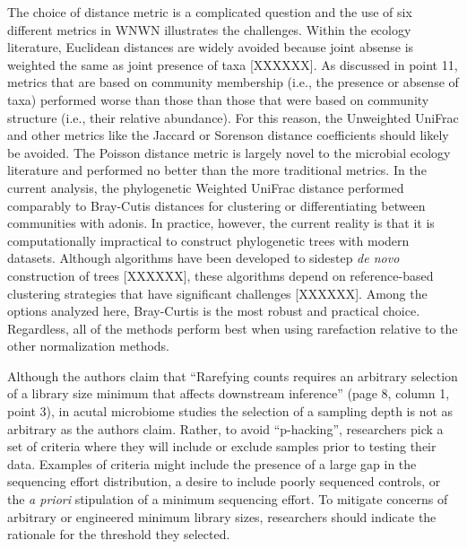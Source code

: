 \documentclass[
]{article}
\begin{document}
The choice of distance metric is a complicated question and the use of
six different metrics in WNWN illustrates the challenges. Within the
ecology literature, Euclidean distances are widely avoided because joint
absense is weighted the same as joint presence of taxa {[}XXXXXX{]}. As
discussed in point 11, metrics that are based on community membership
(i.e., the presence or absense of taxa) performed worse than those than
those that were based on community structure (i.e., their relative
abundance). For this reason, the Unweighted UniFrac and other metrics
like the Jaccard or Sorenson distance coefficients should likely be
avoided. The Poisson distance metric is largely novel to the microbial
ecology literature and performed no better than the more traditional
metrics. In the current analysis, the phylogenetic Weighted UniFrac
distance performed comparably to Bray-Cutis distances for clustering or
differentiating between communities with adonis. In practice, however,
the current reality is that it is computationally impractical to
construct phylogenetic trees with modern datasets. Although algorithms
have been developed to sidestep \emph{de novo} construction of trees
{[}XXXXXX{]}, these algorithms depend on reference-based clustering
strategies that have significant challenges {[}XXXXXX{]}. Among the
options analyzed here, Bray-Curtis is the most robust and practical
choice. Regardless, all of the methods perform best when using
rarefaction relative to the other normalization methods.

Although the authors claim that ``Rarefying counts requires an arbitrary
selection of a library size minimum that affects downstream inference''
(page 8, column 1, point 3), in acutal microbiome studies the selection
of a sampling depth is not as arbitrary as the authors claim. Rather, to
avoid ``p-hacking'', researchers pick a set of criteria where they will
include or exclude samples prior to testing their data. Examples of
criteria might include the presence of a large gap in the sequencing
effort distribution, a desire to include poorly sequenced controls, or
the \emph{a priori} stipulation of a minimum sequencing effort. To
mitigate concerns of arbitrary or engineered minimum library sizes,
researchers should indicate the rationale for the threshold they
selected.
\end{document}
